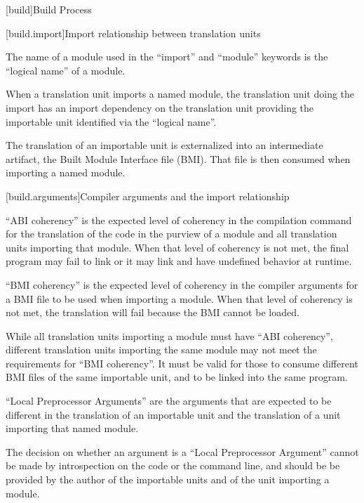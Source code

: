
[build]{Build Process}

%

[build.import]{Import relationship between translation units}

\pnum The name of a module used in the ``import'' and ``module''
keywords is the ``logical name'' of a module.

\pnum When a translation unit imports a named module, the translation
unit doing the import has an import dependency on the translation unit
providing the importable unit identified via the ``logical name''.

\pnum The translation of an importable unit is externalized into an
intermediate artifact, the Built Module Interface file (BMI). That
file is then consumed when importing a named module.

[build.arguments]{Compiler arguments and the import relationship}

\pnum ``ABI coherency'' is the expected level of coherency in the
compilation command for the translation of the code in the purview of a
module and all translation units importing that module. When that
level of coherency is not met, the final program may fail to link or
it may link and have undefined behavior at runtime.

\pnum ``BMI coherency'' is the expected level of coherency in the
compiler arguments for a BMI file to be used when importing a
module. When that level of coherency is not met, the translation will
fail because the BMI cannot be loaded.

\pnum While all translation units importing a module must have ``ABI
coherency'', different translation units importing the same module may
not meet the requirements for ``BMI coherency''. It must be valid for
those to consume different BMI files of the same importable unit, and
to be linked into the same program.

\pnum ``Local Preprocessor Arguments'' are the arguments that are
expected to be different in the translation of an importable unit and
the translation of a unit importing that named module.

\pnum The decision on whether an argument is a ``Local Preprocessor
Argument'' cannot be made by introspection on the code or the command
line, and should be be provided by the author of the importable units
and of the unit importing a module.

